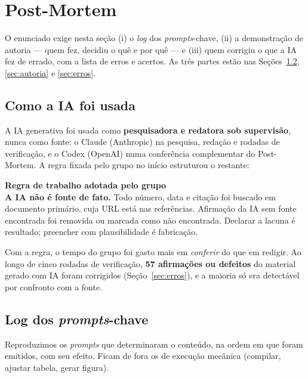 \documentclass[11pt,a4paper]{article}
\newcommand{\destaque}[2]{%
  \begin{center}\begin{minipage}{0.96\textwidth}
  \colorbox{fundo}{\begin{minipage}{\dimexpr\linewidth-2\fboxsep}
  \vspace{2pt}\textbf{\color{azul}\small #1}\\[1pt]\footnotesize #2\vspace{3pt}
  \end{minipage}}\end{minipage}\end{center}}
\begin{document}
\clearpage
\section{Post-Mortem}
\label{sec:postmortem}

O enunciado exige nesta seção (i) o \emph{log} dos \textit{prompts}-chave, (ii) a demonstração de autoria
--- quem fez, decidiu o quê e por quê --- e (iii) quem corrigiu o que a IA fez de errado, com a lista de
erros e acertos. As três partes estão nas Seções~\ref{sec:prompts}, \ref{sec:autoria} e \ref{sec:erros}.

\subsection{Como a IA foi usada}

A IA generativa foi usada como \textbf{pesquisadora e redatora sob supervisão}, nunca como fonte: o
Claude (Anthropic) na pesquisa, redação e rodadas de verificação, e o Codex (OpenAI) numa conferência
complementar do Post-Mortem. A regra fixada pelo grupo no início estruturou o restante:

\destaque{Regra de trabalho adotada pelo grupo}{%
\textbf{A IA não é fonte de fato.} Todo número, data e citação foi buscado em documento primário, cuja URL
está nas referências. Afirmação da IA sem fonte encontrada foi removida ou marcada como não encontrada.
Declarar a lacuna é resultado; preencher com plausibilidade é fabricação.}

Com a regra, o tempo do grupo foi gasto mais em \emph{conferir} do que em redigir. Ao longo de cinco
rodadas de verificação, \textbf{57 afirmações ou defeitos} do material gerado com IA foram corrigidos
(Seção~\ref{sec:erros}), e a maioria só era detectável por confronto com a fonte.

\subsection{Log dos \textit{prompts}-chave}
\label{sec:prompts}

Reproduzimos os \textit{prompts} que determinaram o conteúdo, na ordem em que foram emitidos, com seu
efeito. Ficam de fora os de execução mecânica (compilar, ajustar tabela, gerar figura).
\end{document}
